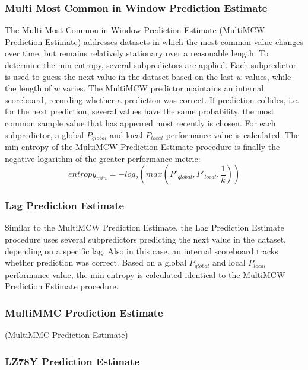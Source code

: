 \subsubsection{Multi Most Common in Window Prediction Estimate}\label{non-iid-est:mmcwpe}
The Multi Most Common in Window Prediction Estimate (MultiMCW Prediction Estimate) addresses datasets in which the most common value changes over time, but remains relatively stationary over a reasonable length. To determine the min-entropy, several subpredictors are applied. Each subpredictor is used to guess the next value in the dataset based on the last $w$ values, while the length of $w$ varies. The MultiMCW predictor maintains an internal scoreboard, recording whether a prediction was correct. If prediction collides, i.e. for the next prediction, several values have the same probability, the most common sample value that has appeared most recently is chosen. For each subpredictor, a global $P_{global}$ and local $P_{local}$ performance value is calculated.
The min-entropy of the MultiMCW Prediction Estimate procedure is finally the negative logarithm of the greater performance metric:
\begin{equation}
entropy_{min} = -log_2\left(max\left(P'_{global}, P'_{local}, \frac{1}{k}\right)\right)
\end{equation}

\subsubsection{Lag Prediction Estimate}\label{non-iid-est:lpe}
Similar to the MultiMCW Prediction Estimate, the Lag Prediction Estimate procedure uses several subpredictors predicting the next value in the dataset, depending on a specific lag. Also in this case, an internal scoreboard tracks whether prediction was correct. Based on a global $P_{global}$ and local $P_{local}$ performance value, the min-entropy is calculated identical to the MultiMCW Prediction Estimate procedure. 

\subsubsection{MultiMMC Prediction Estimate}\label{non-iid-est:mmcpe}
(MultiMMC Prediction Estimate)
\subsubsection{LZ78Y Prediction Estimate}\label{non-iid-est:lz78y}



